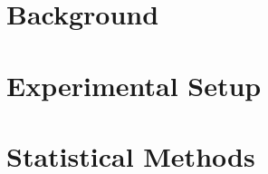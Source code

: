 


\frontmatter
\pagestyle{plain}
\maketitle

\makecommittee

\tableofcontents


\newcommand{\chapterdir}{chapters}
%

\mainmatter
\pagestyle{fancy}


\part{Background}




\part{Experimental Setup}






\part{Statistical Methods}




